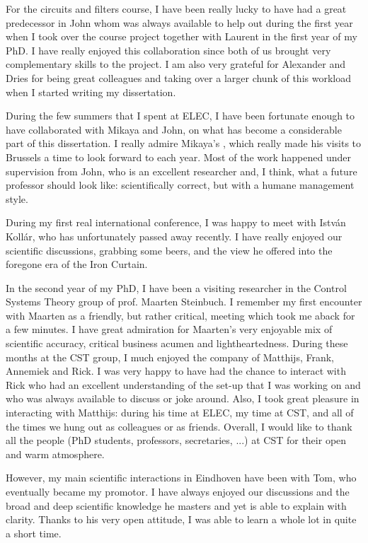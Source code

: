 For the circuits and filters course, I have been really lucky to have had a great predecessor in John whom was always available to help out during the first year when I took over the course project together with Laurent in the first year of my PhD.
I have really enjoyed this collaboration since both of us brought very complementary skills to the project.
I am also very grateful for Alexander and Dries for being great colleagues and taking over a larger chunk of this workload when I started writing my dissertation.

During the few summers that I spent at ELEC, I have been fortunate enough to have collaborated with Mikaya and John, on what has become a considerable part of this dissertation.
I really admire Mikaya's , which really made his visits to Brussels a time to look forward to each year.
Most of the work happened under supervision from John, who is an excellent researcher and, I think, what a future professor should look like: scientifically correct, but with a humane management style.


During my first real international conference, I was happy to meet with István Kollár, who has unfortunately passed away recently. 
I have really enjoyed our scientific discussions, grabbing some beers, and the view he offered into the foregone era of the Iron Curtain.


In the second year of my PhD, I have been a visiting researcher in the Control Systems Theory group of prof. Maarten Steinbuch.
I remember my first encounter with Maarten as a friendly, but rather critical, meeting which took me aback for a few minutes.
I have great admiration for Maarten's very enjoyable mix of scientific accuracy, critical business acumen and lightheartedness.
During these months at the CST group, I much enjoyed the company of Matthijs, Frank, Annemiek and Rick.
I was very happy to have had the chance to interact with Rick who had an excellent understanding of the set-up that I was working on and who was always available to discuss or joke around.
Also, I took great pleasure in interacting with Matthijs: during his time at ELEC, my time at CST, and all of the times we hung out as colleagues or as friends.
Overall, I would like to thank all the people (PhD students, professors, secretaries, ...) at CST for their open and warm atmosphere.

However, my main scientific interactions in Eindhoven have been with Tom, who eventually became my promotor.
I have always enjoyed our discussions and the broad and deep scientific knowledge he masters and yet is able to explain with clarity.
Thanks to his very open attitude, I was able to learn a whole lot in quite a short time.

